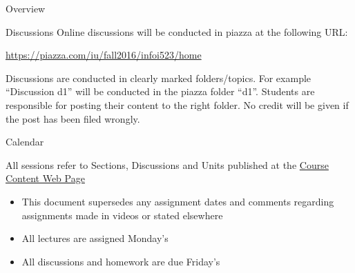 \begin{edXchapter}{Overview}
\begin{edXsection}{Discussions}
Online discussions will be conducted in piazza at the following URL:

\url{https://piazza.com/iu/fall2016/infoi523/home}

Discussions are conducted in clearly marked folders/topics. For example
``Discussion d1'' will be conducted in the piazza folder ``d1''.
Students are responsible for posting their content to the right folder.
No credit will be given if the post has been filed wrongly.

\end{edXsection}
\begin{edXsection}{Calendar}\label{calendar}

All sessions refer to Sections, Discussions and Units published at the
\href{http://openedx.scholargrid.org/courses/SoIC/INFO-I-523/Fall_2016/courseware/f712efaeae5a4d6ea2c87a0f34e0720b/}{Course
Content Web Page}

\begin{itemize}
\itemsep1pt\parskip0pt
\item
  This document supersedes any assignment dates and comments regarding
  assignments made in videos or stated elsewhere
\item
  All lectures are assigned Monday's
\item
  All discussions and homework are due Friday's
\end{itemize}


\end{edXsection}
\end{edXchapter}
